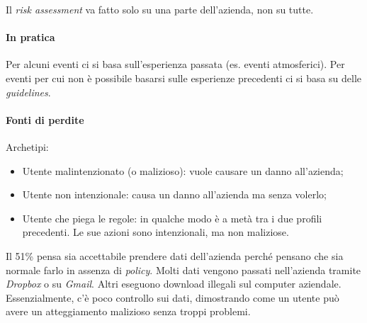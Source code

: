 Il \textit{risk assessment} va fatto solo su una parte dell'azienda, non su
tutte.

\paragraph*{In pratica}

Per alcuni eventi ci si basa sull'esperienza passata (es. eventi atmosferici).
Per eventi per cui non è possibile basarsi sulle esperienze precedenti ci si
basa su delle \textit{guidelines}.

\paragraph*{Fonti di perdite}

Archetipi:
\begin{itemize}
\item Utente malintenzionato (o malizioso): vuole causare un danno all'azienda;
\item Utente non intenzionale: causa un danno all'azienda ma senza volerlo;
\item Utente che piega le regole: in qualche modo è a metà tra i due profili
precedenti. Le sue azioni sono intenzionali, ma non maliziose.
\end{itemize}

Il 51\% pensa sia accettabile prendere dati dell'azienda perché pensano che sia
normale farlo in assenza di \textit{policy}. Molti dati vengono passati
nell'azienda tramite \textit{Dropbox} o su \textit{Gmail}. Altri eseguono
download illegali sul computer aziendale. Essenzialmente, c'è poco controllo
sui dati, dimostrando come un utente può avere un atteggiamento malizioso senza
troppi problemi.

